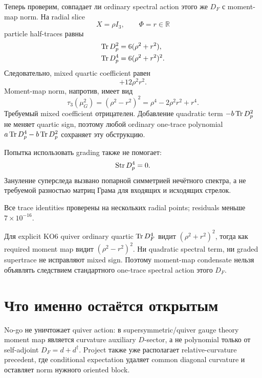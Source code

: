 Теперь проверим, совпадает ли ordinary spectral action этого же
\(D_F\) с moment-map norm. На radial slice
\begin{equation}
 X=\rho I_3,
 \qquad
 \Phi=r\in\mathbb R
\end{equation}
particle half-traces равны
\begin{align}
 \operatorname{Tr} D_p^2&=6(\rho^2+r^2),\\
 \operatorname{Tr} D_p^4&=6(\rho^2+r^2)^2.
 \label{eq:family-quiver-ordinary-traces}
\end{align}
Следовательно, mixed quartic coefficient равен
\begin{equation}
 +12\rho^2r^2.
\end{equation}
Moment-map norm, напротив, имеет вид
\begin{equation}
 \tau_3(\mu_G^2)
 =(\rho^2-r^2)^2
 =\rho^4-2\rho^2r^2+r^4.
 \label{eq:family-quiver-moment-sign}
\end{equation}
Требуемый mixed coefficient отрицателен. Добавление quadratic term
\(-b\operatorname{Tr} D_p^2\) не меняет quartic sign, поэтому любой ordinary one-trace
polynomial \(a\operatorname{Tr} D_p^4-b\operatorname{Tr} D_p^2\) сохраняет эту обструкцию.

Попытка использовать grading также не помогает:
\begin{equation}
 \operatorname{Str} D_p^4=0.
\end{equation}
Зануление суперследа вызвано попарной симметрией нечётного спектра, а не
требуемой разностью матриц Грама для входящих и исходящих стрелок.

Все trace identities проверены на нескольких radial points; residuals
меньше \(7\times10^{-16}\).

\begin{nogocriterion}
Для explicit KO6 quiver ordinary quartic \(\operatorname{Tr} D_F^4\) видит
\((\rho^2+r^2)^2\), тогда как required moment map видит
\((\rho^2-r^2)^2\). Ни quadratic spectral term, ни graded supertrace не
исправляют mixed sign. Поэтому moment-map condensate нельзя объявлять
следствием стандартного one-trace spectral action этого \(D_F\).
\end{nogocriterion}

\section{Что именно остаётся открытым}

No-go не уничтожает quiver action: в supersymmetric/quiver gauge theory
moment map является curvature auxiliary \(D\)-sector, а не polynomial
только от self-adjoint \(D_F=d+d^\dagger\). Project также уже располагает
relative-curvature precedent, где conditional expectation удаляет common
diagonal curvature и оставляет norm нужного oriented block.

